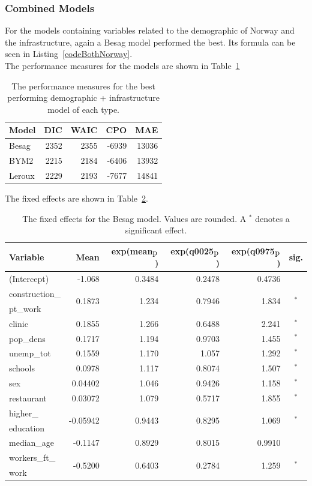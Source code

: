 \subsubsection{Combined Models}
For the models containing variables related to the demographic of Norway and the infrastructure, again a Besag model performed the best. Its formula can be seen in Listing~\ref{codeBothNorway}. \\
The performance measures for the models are shown in Table~\ref{bothNorway}
\begin{table}[H] 
\caption{The performance measures for the best performing demographic + infrastructure model of each type. \label{bothNorway}}
\begin{tabular}{l r r r r}
\toprule
\textbf{Model}	& \textbf{DIC}	& \textbf{WAIC} & \textbf{CPO} & \textbf{MAE} \\
\midrule
Besag  & 2352 & 2355 & -6939 & 13036 \\
BYM2 & 2215 & 2184 & -6406 & 13932\\
Leroux &  2229 & 2193 & -7677 & 14841\\
\bottomrule
\end{tabular}
\end{table}
The fixed effects are shown in Table~\ref{fixedAllNorway}.
\begin{table}[H] 
\caption{The fixed effects for the Besag model. Values are rounded. A $^*$ denotes a significant effect.\label{fixedAllNorway}}
\begin{tabular}{l r r r r c}
\toprule
\textbf{Variable}	& \textbf{Mean}	& \textbf{exp(mean$_{\hbox{p}}$)} & \textbf{exp(q0025$_{\hbox{p}}$)} & \textbf{exp(q0975$_{\hbox{p}}$)} & \textbf{sig.}\\
\midrule
(Intercept) & -1.068 & 0.3484 & 0.2478 & 0.4736 &\\
construction\_ & \multirow{2}{*}{0.1873} & \multirow{2}{*}{1.234} & \multirow{2}{*}{0.7946} & \multirow{2}{*}{1.834} & \multirow{2}{*}{$^*$} \\
pt\_work \\
clinic & 0.1855 & 1.266 & 0.6488 & 2.241 & $^*$\\
pop\_dens & 0.1717 & 1.194 & 0.9703 & 1.455 & $^*$\\
unemp\_tot & 0.1559 & 1.170 & 1.057 & 1.292 & $^*$\\
schools & 0.0978 & 1.117 & 0.8074 & 1.507 & $^*$\\
sex & 0.04402 & 1.046 & 0.9426 & 1.158 & $^*$\\
restaurant & 0.03072 & 1.079 & 0.5717 & 1.855 & $^*$\\
higher\_& \multirow{2}{*}{-0.05942} & \multirow{2}{*}{0.9443} & \multirow{2}{*}{0.8295} & \multirow{2}{*}{1.069} & \multirow{2}{*}{$^*$}\\
education\\
median\_age & -0.1147 & 0.8929 & 0.8015 & 0.9910 & \\
workers\_ft\_ & \multirow{2}{*}{-0.5200} & \multirow{2}{*}{0.6403} & \multirow{2}{*}{0.2784} & \multirow{2}{*}{1.259} & \multirow{2}{*}{$^*$}\\
work\\
\bottomrule
\end{tabular}
\end{table}
